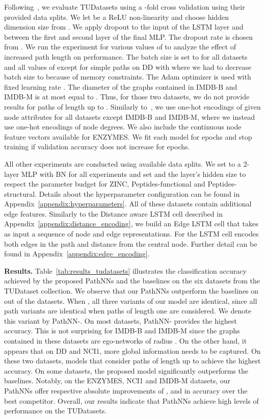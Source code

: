 \documentclass{article}
\theoremstyle{plain}
\theoremstyle{definition}
\theoremstyle{remark}
\begin{document}
Following~\citet{errica2019fair}, we evaluate TUDatasets using a -fold cross validation using their provided data splits. 
We let  be a ReLU non-linearity and choose hidden dimension size from .
We apply dropout to the input of the LSTM layer and between the first and second layer of the final MLP. 
The dropout rate is chosen from . 
We run the experiment for various values of  to analyze the effect of increased path length on performance. 
The batch size is set to  for all datasets and all values of  except for simple paths on DD with  where we had to decrease batch size to  because of memory constraints. 
The Adam optimizer is used with fixed learning rate .
The diameter of the graphs contained in IMDB-B and IMDB-M is at most equal to .
Thus, for those two datasets, we do not provide results for paths of length up to .
Similarly to~\citet{errica2019fair}, we use one-hot encodings of given node attributes for all datasets except IMDB-B and IMDB-M, where we instead use one-hot encodings of node degrees. 
We also include the  continuous node feature vectors available for ENZYMES. 
We fit each model for  epochs and stop training if validation accuracy does not increase for  epochs. 

All other experiments are conducted using available data splits. 
We set  to a 2-layer MLP with BN for all experiments and set  and the layer's hidden size to respect the  parameter budget for ZINC, Peptides-functional and Peptides-structural. 
Details about the hyperparameter configuration can be found in Appendix~\ref{appendix:hyperparameters}. 
All of these datasets contain additional edge features. 
Similarly to the Distance aware LSTM cell described in Appendix~\ref{appendix:distance_encoding}, we build an Edge LSTM cell that takes as input a sequence of node and edge representations. 
For  the LSTM cell encodes both edges in the path and distance from the central node. 
Further detail can be found in Appendix~\ref{appendix:edge_encoding}. 


\textbf{Results.}
Table~\ref{tab:results_tudatasets} illustrates the classification accuracy achieved by the proposed PathNNs and the baselines on the six datasets from the TUDataset collection.
We observe that our PathNNs outperform the baselines on  out of the  datasets.
When , all three variants of our model are identical, since all path variants are identical when paths of length one are considered. 
We denote this variant by PathNN-. 
On most datasets, PathNN- provides the highest accuracy.
This is not surprising for IMDB-B and IMDB-M since the graphs contained in these datasets are ego-networks of radius .
On the other hand, it appears that on DD and NCI1, more global information needs to be captured.
On these two datasets, models that consider paths of length up to  achieve the highest accuracy.
On some datasets, the proposed model significantly outperforms the baselines.
Notably, on the ENZYMES, NCI1 and IMDB-M datasets, our PathNNs offer respective absolute improvements of ,  and  in accuracy over the best competitor.
Overall, our results indicate that PathNNs achieve high levels of performance on the TUDatasets.
\end{document}
